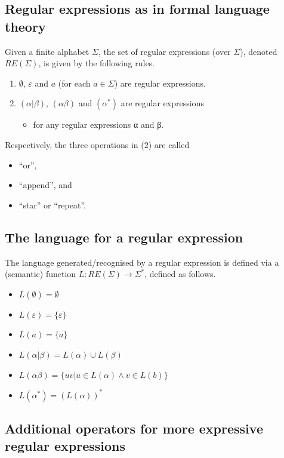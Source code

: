 \documentclass[11pt]{article}
\theoremstyle{definition}
\begin{document}
\subsection{Regular expressions as in formal language theory}
\label{sec:orgf351cdb}

Given a finite alphabet \(Σ\),
the set of regular expressions (over \(Σ\)),
denoted \(RE(Σ)\), is given
by the following rules.
\begin{enumerate}
\item \(∅\), \(ε\) and \(a\) (for each \(a ∈ Σ\)) are regular expressions.
\item \((α | β)\), \((αβ)\) and \((α^{*})\) are regular expressions
\begin{itemize}
\item for any regular expressions α and β.
\end{itemize}
\end{enumerate}

Respectively, the three operations in (2) are called
\begin{itemize}
\item “or”,
\item “append”, and
\item “star” or “repeat”.
\end{itemize}

\subsection{The language for a regular expression}
\label{sec:org423de27}

The language generated/recognised by a regular expression
is defined via a (semantic) function \(L : RE(Σ) → Σ^{*}\),
defined as follows.
\begin{itemize}
\item \(L(∅) = ∅\)
\item \(L(ε) = \{ ε \}\)
\item \(L(a) = \{ a \}\)
\item \(L(α | β) = L(α) ∪ L(β)\)
\item \(L(αβ) = \{ uv | u ∈ L(α) ∧ v ∈ L(b) \}\)
\item \(L(α^*) = (L(α))^*\)
\end{itemize}

\subsection{Additional operators for more expressive regular expressions}
\label{sec:orgb12951a}
\end{document}
